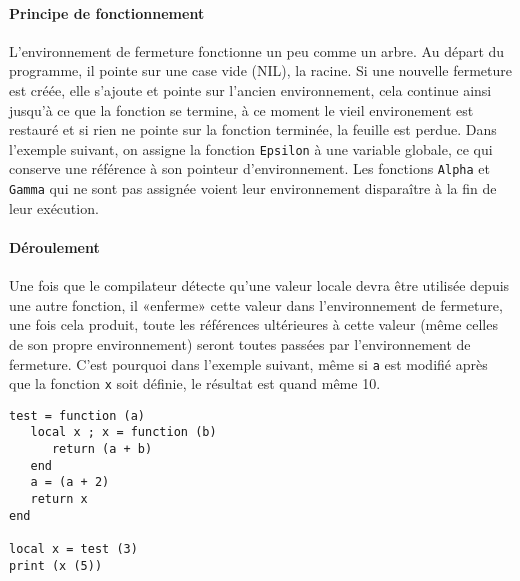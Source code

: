 \documentclass{article}
\begin{document}
\paragraph{Principe de fonctionnement}
L'environnement de fermeture fonctionne un peu comme un arbre. Au départ du programme, il pointe sur une case vide (NIL), la racine. Si une nouvelle fermeture est créée, elle s'ajoute et pointe sur l'ancien environnement, cela continue ainsi jusqu'à ce que la fonction se termine, à ce moment le vieil environement est restauré et si rien ne pointe sur la fonction terminée, la feuille est perdue. Dans l'exemple suivant, on assigne la fonction \texttt{Epsilon} à une variable globale, ce qui conserve une référence à son pointeur d'environnement. Les fonctions \texttt{Alpha} et \texttt{Gamma} qui ne sont pas assignée voient leur environnement disparaître à la fin de leur exécution.

\tikzset{>=latex}
\begin{center}
\end{center}

\paragraph{Déroulement}
Une fois que le compilateur détecte qu'une valeur locale devra être utilisée depuis une autre fonction, il «enferme» cette valeur dans l'environnement de fermeture, une fois cela produit, toute les références ultérieures à cette valeur (même celles de son propre environnement) seront toutes passées par l'environnement de fermeture. C'est pourquoi dans l'exemple suivant, même si \texttt{a} est modifié après que la fonction \texttt{x} soit définie, le résultat est quand même 10.
\begin{lstlisting}[style=lua, caption={Fermeture},label=DescriptiveLabel]
test = function (a) 
   local x ; x = function (b) 
      return (a + b) 
   end 
   a = (a + 2) 
   return x 
end 

local x = test (3)
print (x (5)) 
\end{lstlisting}
\end{document}
